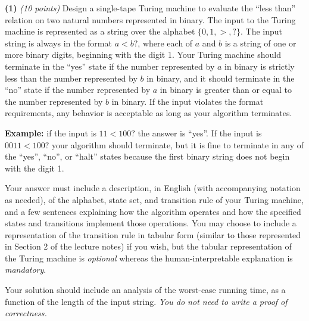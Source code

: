 \documentclass[11pt]{article}
\def\bigap{0.25in}
\begin{document}
\setlength{\parindent}{0in}
\addtolength{\parskip}{0.1cm}
\setlength{\fboxrule}{.5mm}\setlength{\fboxsep}{1.2mm}
\newlength{\boxlength}\setlength{\boxlength}{\textwidth}
\addtolength{\boxlength}{-4mm}
\begin{center}
\end{center}
\vspace{5mm}

{ \bf (1)} {\em (10 points)}
Design a single-tape Turing machine to evaluate the ``less than'' 
relation on two natural numbers represented in binary.
The input to the Turing machine is represented as a 
string over the alphabet $\{0,1,>,?\}$. The input string
is always in the format $a < b ?$, where each of $a$ and 
$b$ is a string of one or more binary digits, beginning
with the digit 1. Your
Turing machine should terminate in the ``yes'' state
if the number represented by $a$ in binary is strictly
less than the number represented by $b$ in binary,
and it should terminate in the ``no'' state if the number
represented by $a$ in binary is greater than or equal 
to the number represented by $b$ in binary. If the
input violates the format requirements, any behavior
is acceptable as long as your algorithm terminates.

{\bf Example:} if the input is $11<100?$ the answer is ``yes''.
If the input is $0011<100?$ your algorithm should terminate,
but it is fine to terminate in any of the ``yes'', ``no'', or
``halt'' states because the first binary string does not
begin with the digit 1.

Your answer must include a description, in English (with
accompanying notation as needed), of the alphabet, state set, and 
transition rule of your Turing machine, and a few sentences
explaining how the algorithm operates and how the specified
states and transitions implement those operations. You may choose to
include a representation of the transition rule in tabular 
form (similar to those represented in Section 2 of the lecture notes) if
you wish, but the tabular representation of the Turing machine
is {\em optional} whereas the human-interpretable explanation
is {\em mandatory}.

Your solution should include an analysis of the worst-case 
running time, as a function of the length of the input string. 
{\em You do not need to write a proof of 
correctness.}


\vskip \bigap

\end{document}
